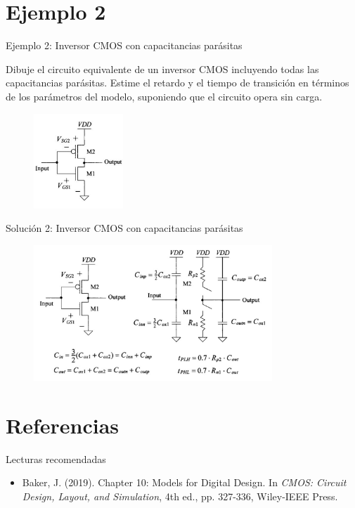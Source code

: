 \documentclass[t,aspectratio=169]{beamer}
\begin{document}
\section{Ejemplo 2}
\begin{frame}{Ejemplo 2: Inversor CMOS con capacitancias parásitas}

Dibuje el circuito equivalente de un inversor CMOS incluyendo todas las capacitancias parásitas. Estime el retardo y el tiempo de transición en términos de los parámetros del modelo, suponiendo que el circuito opera sin carga.

\begin{figure}[H]
    \centering
    \includegraphics[width=0.3\textwidth]{figuras/inversor_cmos_enunciado.png}
\end{figure}


\end{frame}


\begin{frame}{Solución 2: Inversor CMOS con capacitancias parásitas}

\begin{figure}[H]
    \centering
    \includegraphics[width=0.8\textwidth]{figuras/inversor_cmos_solucion.png}
\end{figure}

\end{frame}


\section{Referencias}
\begin{frame}{Lecturas recomendadas}

\begin{itemize}
    \item Baker, J. (2019). Chapter 10: Models for Digital Design. In \textit{CMOS: Circuit Design, Layout, and Simulation}, 4th ed., pp. 327-336, Wiley-IEEE Press.
\end{itemize}

\end{frame}
\end{document}

